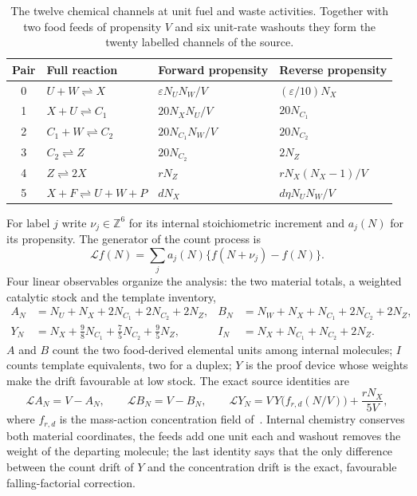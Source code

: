 \documentclass[11pt,a4paper]{article}
\theoremstyle{plain}
\theoremstyle{definition}
\theoremstyle{remark}
\newcommand{\eps}{\varepsilon}
\newcommand{\Lgen}{\mathcal L}
\newcommand{\Iv}{I}
\begin{document}
\begin{table}[tb]
\centering\small
\begin{tabular}{clll}
\toprule
Pair & Full reaction & Forward propensity & Reverse propensity\\
\midrule
0 & $U+W\rightleftharpoons X$ & $\eps N_UN_W/V$ & $(\eps/10)N_X$\\
1 & $X+U\rightleftharpoons C_1$ & $20N_XN_U/V$ & $20N_{C_1}$\\
2 & $C_1+W\rightleftharpoons C_2$ & $20N_{C_1}N_W/V$ & $20N_{C_2}$\\
3 & $C_2\rightleftharpoons Z$ & $20N_{C_2}$ & $2N_Z$\\
4 & $Z\rightleftharpoons 2X$ & $rN_Z$ & $rN_X(N_X-1)/V$\\
5 & $X+F\rightleftharpoons U+W+P$ & $dN_X$ & $d\eta N_UN_W/V$\\
\bottomrule
\end{tabular}
\caption{The twelve chemical channels at unit fuel and waste activities. Together with two food feeds of propensity $V$ and six unit-rate washouts they form the twenty labelled channels of the source.}
\label{tab:rates}
\end{table}

For label $j$ write $\nu_j\in\mathbb Z^6$ for its internal stoichiometric increment and $a_j(N)$ for its propensity. The generator of the count process is
\begin{equation}\label{eq:generator}
\Lgen f(N)=\sum_{j}a_j(N)\bigl\{f(N+\nu_j)-f(N)\bigr\}.
\end{equation}
Four linear observables organize the analysis: the two material totals, a weighted catalytic stock and the template inventory,
\begin{equation}\label{eq:observables}
\begin{aligned}
A_N&=N_U+N_X+2N_{C_1}+2N_{C_2}+2N_Z,& B_N&=N_W+N_X+N_{C_1}+2N_{C_2}+2N_Z,\\
Y_N&=N_X+\tfrac98N_{C_1}+\tfrac75N_{C_2}+\tfrac95N_Z,& \Iv_N&=N_X+N_{C_1}+N_{C_2}+2N_Z.
\end{aligned}
\end{equation}
$A$ and $B$ count the two food-derived elemental units among internal molecules; $\Iv$ counts template equivalents, two for a duplex; $Y$ is the proof device whose weights make the drift favourable at low stock. The exact source identities are
\begin{equation}\label{eq:drift}
\Lgen A_N=V-A_N,\qquad \Lgen B_N=V-B_N,\qquad
\Lgen Y_N=V\,Y\bigl(f_{r,d}(N/V)\bigr)+\frac{rN_X}{5V},
\end{equation}
where $f_{r,d}$ is the mass-action concentration field of~\citep{recovery2026}. Internal chemistry conserves both material coordinates, the feeds add one unit each and washout removes the weight of the departing molecule; the last identity says that the only difference between the count drift of $Y$ and the concentration drift is the exact, favourable falling-factorial correction.
\end{document}
